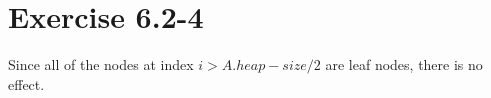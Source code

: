 \documentclass{article}
\begin{document}
\section*{Exercise 6.2-4}

Since all of the nodes at index $i > A.heap-size/2$ are leaf nodes, there is
no effect.
\end{document}
